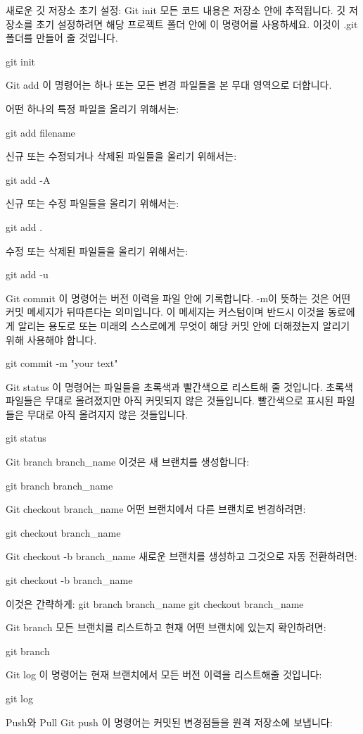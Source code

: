 새로운 깃 저장소 초기 설정: Git init
모든 코드 내용은 저장소 안에 추적됩니다. 깃 저장소를 초기 설정하려면 해당 프로젝트 폴더 안에 이 명령어를 사용하세요. 이것이 .git 폴더를 만들어 줄 것입니다.

git init

Git add
이 명령어는 하나 또는 모든 변경 파일들을 본 무대 영역으로 더합니다.

어떤 하나의 특정 파일을 올리기 위해서는:

git add filename

신규 또는 수정되거나 삭제된 파일들을 올리기 위해서는:

git add -A

신규 또는 수정 파일들을 올리기 위해서는:

git add .

수정 또는 삭제된 파일들을 올리기 위해서는:

git add -u

Git commit
이 명령어는 버전 이력을 파일 안에 기록합니다. -m이 뜻하는 것은 어떤 커밋 메세지가 뒤따른다는 의미입니다. 이 메세지는 커스텀이며 반드시 이것을 동료에게 알리는 용도로 또는 미래의 스스로에게 무엇이 해당 커밋 안에 더해졌는지 알리기 위해 사용해야 합니다.

git commit -m "your text"

Git status
이 명령어는 파일들을 초록색과 빨간색으로 리스트해 줄 것입니다. 초록색 파일들은 무대로 올려졌지만 아직 커밋되지 않은 것들입니다. 빨간색으로 표시된 파일들은 무대로 아직 올려지지 않은 것들입니다.

git status

Git branch branch_name
이것은 새 브랜치를 생성합니다:

git branch branch_name

Git checkout branch_name
어떤 브랜치에서 다른 브랜치로 변경하려면:

git checkout branch_name

Git checkout -b branch_name
새로운 브랜치를 생성하고 그것으로 자동 전환하려면:

git checkout -b branch_name

이것은 간략하게:
git branch branch_name
git checkout branch_name


Git branch
모든 브랜치를 리스트하고 현재 어떤 브랜치에 있는지 확인하려면:

git branch

Git log
이 명령어는 현재 브랜치에서 모든 버전 이력을 리스트해줄 것입니다:

git log

Push와 Pull
Git push
이 명령어는 커밋된 변경점들을 원격 저장소에 보냅니다:

